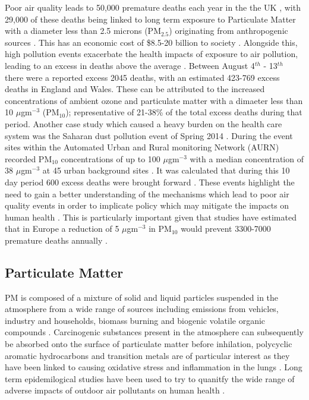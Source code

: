 \documentclass[10pt]{article}
\begin{document}
Poor air quality leads to 50,000 premature deaths each year in the the UK
 \cite{HOC2009}, with 29,000  of these deaths being linked to long term 
 exposure to Particulate Matter with a diameter less than 2.5 microns (PM$_{2.5}$) originating from anthropogenic sources \cite{Macintyre2016}. This has an economic cost of \$8.5-20 billion to society \cite{HOC2009}. Alongside this, high pollution events exacerbate the health impacts of exposure to air pollution, leading to an excess in deaths above the average \cite{Stedman2004}. Between August 4$^{th}$ - 13$^{th}$ there were a reported excess 2045 deaths, with an estimated 423-769 excess deaths in England and Wales. These can be attributed to the increased concentrations of ambient ozone and particulate matter with a dimaeter less than 10 $\mu$gm$^{-3}$ (PM$_{10}$); representative of 21-38\% of the total excess deaths during that period. Another case study which caused a heavy burden on the health care system was the Saharan dust pollution event of Spring 2014 \cite{Vieno2016}. During the event sites within the Automated Urban and Rural monitoring Network (AURN) recorded PM$_{10}$ concentrations of up to 100 $\mu$gm$^{-3}$ with a median concentration of 38 $\mu$gm$^{-3}$ at 45 urban background sites \cite{Vieno2016}. It was calculated that during this 10 day period 600 excess deaths were brought forward \cite{Macintyre2016}. These events highlight the need to gain a better understanding of the mechanisms which lead to poor air quality events in order to implicate policy which may mitigate the impacts on human health \cite{Vieno2016}. This is particularly important given that studies have estimated that in Europe a reduction of 5 $\mu$gm$^{-3}$ in PM$_{10}$ would prevent 3300-7000 premature deaths annually \cite{Abbey1999}.\\
 
\subsection*{Particulate Matter} 
 
PM is composed of a mixture of solid and liquid particles suspended in the atmosphere from a wide range of sources including emissions from vehicles, industry and households, biomass burning and biogenic volatile organic compounds \cite{Polichetti2009}. Carcinogenic substances present in the atmosphere can subsequently be absorbed onto the surface of particulate matter before inhilation, polycyclic aromatic hydrocarbons and transition metals are of particular interest as they have been linked to causing oxidative stress and inflammation in the lungs \cite{Raaschou-Nielsen2013}. Long term epidemilogical studies have been used to try to quanitfy the wide range of adverse impacts of outdoor air pollutants on human health \cite{Atkinson2015}.\\
\end{document}

